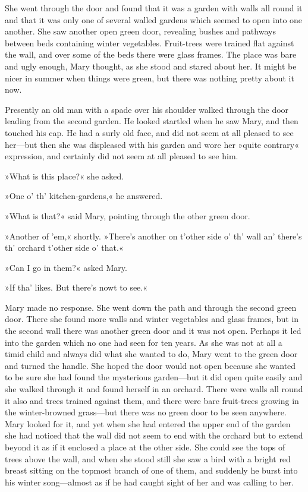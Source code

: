 She went through the door and found that it was a garden with walls all round it and that it was only one of several walled gardens which seemed to open into one another. She saw another open green door, revealing bushes and pathways between beds containing winter vegetables. Fruit-trees were trained flat against the wall, and over some of the beds there were glass frames. The place was bare and ugly enough, Mary thought, as she stood and stared about her. It might be nicer in summer when things were green, but there was nothing pretty about it now.

Presently an old man with a spade over his shoulder walked through the door leading from the second garden. He looked startled when he saw Mary, and then touched his cap. He had a surly old face, and did not seem at all pleased to see her—but then she was displeased with his garden and wore her »quite contrary« expression, and certainly did not seem at all pleased to see him.

»What is this place?« she asked.

»One o' th' kitchen-gardens,« he answered.

»What is that?« said Mary, pointing through the other green door.

»Another of 'em,« shortly. »There's another on t'other side o' th' wall an' there's th' orchard t'other side o' that.«

»Can I go in them?« asked Mary.

»If tha' likes. But there's nowt to see.«

Mary made no response. She went down the path and through the second green door. There she found more walls and winter vegetables and glass frames, but in the second wall there was another green door and it was not open. Perhaps it led into the garden which no one had seen for ten years. As she was not at all a timid child and always did what she wanted to do, Mary went to the green door and turned the handle. She hoped the door would not open because she wanted to be sure she had found the mysterious garden—but it did open quite easily and she walked through it and found herself in an orchard. There were walls all round it also and trees trained against them, and there were bare fruit-trees growing in the winter-browned grass—but there was no green door to be seen anywhere. Mary looked for it, and yet when she had entered the upper end of the garden she had noticed that the wall did not seem to end with the orchard but to extend beyond it as if it enclosed a place at the other side. She could see the tops of trees above the wall, and when she stood still she saw a bird with a bright red breast sitting on the topmost branch of one of them, and suddenly he burst into his winter song—almost as if he had caught sight of her and was calling to her.


